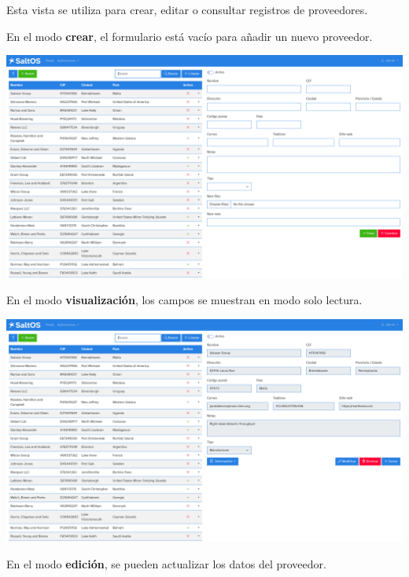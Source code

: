 \documentclass[a4paper]{article}
\begin{document}
Esta vista se utiliza para crear, editar o consultar registros de proveedores.

En el modo \textbf{crear}, el formulario está vacío para añadir un nuevo proveedor.

\begin{center}\includegraphics[width=1\textwidth]{../ujest/snaps/test-screenshots-js-screenshots-purchases-suppliers-create-es-es-1-snap.png}\end{center}

En el modo \textbf{visualización}, los campos se muestran en modo solo lectura.

\begin{center}\includegraphics[width=1\textwidth]{../ujest/snaps/test-screenshots-js-screenshots-purchases-suppliers-view-100-es-es-1-snap.png}\end{center}

En el modo \textbf{edición}, se pueden actualizar los datos del proveedor.
\end{document}
